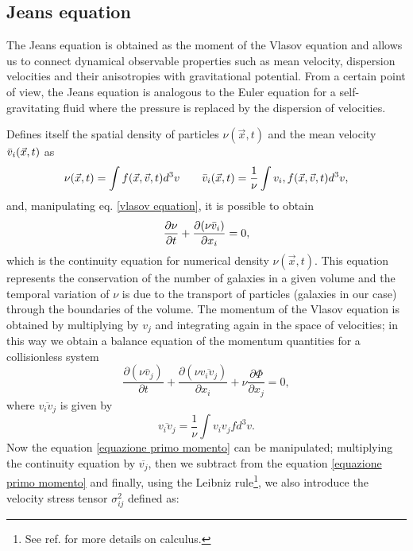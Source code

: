 \subsection{Jeans equation}
The Jeans equation is obtained as the moment of the Vlasov equation and allows us to connect dynamical observable properties such as mean velocity, dispersion velocities and their anisotropies with gravitational potential. From a certain point of view, the Jeans equation is analogous to the Euler equation for a self-gravitating fluid where the pressure is replaced by the dispersion of velocities.

Defines itself the spatial density of particles $\nu (\Vec{x}, t)$ and the mean velocity $\Bar{v}_i (\Vec{x}, t)$ as
\begin{equation}\label{momenti}
    \nu (\Vec{x}, t) = \int f(\Vec{x}, \Vec{v}, t) d^3v \qquad \Bar{v}_i (\Vec{x}, t) = \frac{1}{\nu} \int v_i,f(\Vec{x}, \Vec{v}, t) d^3v,
\end{equation}
and, manipulating eq. \eqref{vlasov equation}, it is possible to obtain
\begin{equation}\label{equazione di continuità jeans}
    \frac{\partial\nu}{\partial t} + \frac{\partial(\nu \Bar{v}_i)}{\partial x_i} = 0,
\end{equation}
which is the continuity equation for numerical density $\nu(\Vec{x},t)$. This equation represents the conservation of the number of galaxies in a given volume and the temporal variation of $\nu$ is due to the transport of particles (galaxies in our case) through the boundaries of the volume. 
The momentum of the Vlasov equation is obtained by multiplying by $v_j$ and integrating again in the space of velocities; in this way we obtain a balance equation of the momentum quantities for a collisionless system
\begin{equation} \label{equazione primo momento}
    \frac{\partial (\nu \bar{v}_j)}{\partial t} + \frac{\partial (\nu\overline{v_i v_j})}{\partial x_i} + \nu\frac{\partial \Phi}{\partial x_j} = 0,
\end{equation}
where $\overline{v_i v_j}$ is given by
\begin{equation}
    \overline{v_i v_j} = \frac{1}{\nu} \int v_i v_j f d^3 v.
\end{equation}
Now the equation \eqref{equazione primo momento} can be manipulated; multiplying the continuity equation by $\overline{v_j}$, then we subtract from the equation \eqref{equazione primo momento} and finally, using the Leibniz rule\footnote{See ref. \cite{Rottgering2011Lecture10} for more details on calculus.}, we also introduce the velocity stress tensor $\sigma^2_{ij}$ defined as:
